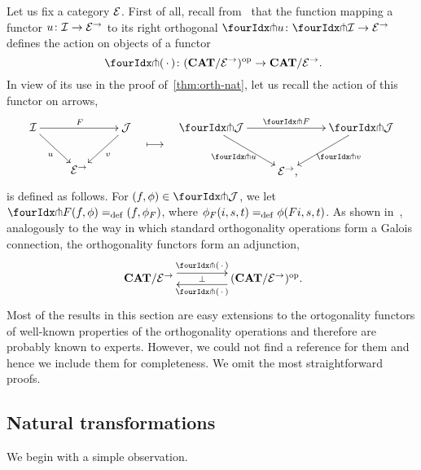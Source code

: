 \documentclass[reqno,10pt,a4paper,oneside]{amsart}
\begin{document}
Let us fix a category $\cal{E}$.
First of all, recall from~\cite{garner:small-object-argument} that the function mapping a functor $u \co \cal{I} \to \catE^\to$ to its right orthogonal $\liftr{u} \co \liftr{\cal{I}} \to \catE^\to$ defines the action on objects of a functor
\[
  \liftr{\brarghole} \co (\CAT/\catE^\to)^{\op} \to \CAT/\catE^\to \rlap{.}
\]
In view of its use in the proof of~\cref{thm:orth-nat}, let us recall the action of this functor on arrows,
\begin{align*}
\xymatrix{
  \cal{I} \ar[dr]_u \ar[rr]^F & & \cal{J} \ar[dl]^{v} \\
  & \catE^\to
}
&&
\xymatrix{
  \ar@{}[d]|{\textstyle\longmapsto} \\
  {}
}
&&
\xymatrix{
  \liftr{\cal{J}} \ar[dr]_{\liftr{u}} \ar[rr]^{\liftr{F}} & & \liftr{\cal{J}} \ar[dl]^{\liftr{v}} \\
  & \catE^\to \rlap{,}
}
\end{align*}
is defined as follows.
For $(f, \phi) \in \liftr{\cal{J}}$, we let $\liftr{F}(f,\phi) \defeq (f, \phi_F)$, where $\phi_F(i, s, t) \defeq \phi(Fi, s, t)$.
As shown in~\cite[Proposition~3.8]{garner:small-object-argument}, analogously to the way in which standard orthogonality operations form a Galois connection, the orthogonality functors form an adjunction,
\begin{equation} \label{garner-adjunction}
\begin{gathered}
\xymatrix@C+2em{
  \CAT/\catE^\to
  \ar@<5pt>[r]^-{\liftl{\brarghole}}
  \ar@{}[r]|-{\bot}
&
  (\CAT/\catE^\to)^{\op} \rlap{.}
  \ar@<5pt>[l]^-{\liftr{\brarghole}}
}
\end{gathered}
\end{equation}
Most of the results in this section are easy extensions to the ortogonality functors of well-known properties of the orthogonality operations and therefore are probably known to experts.
However, we could not find a reference for them and hence we include them for completeness.
We omit the most straightforward proofs.


\subsection*{Natural transformations} We begin with a simple observation.
\end{document}
